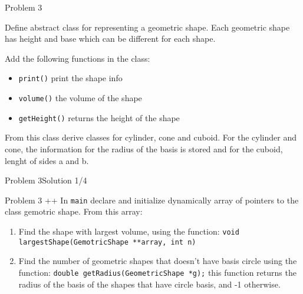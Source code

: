 \begin{frame}{Problem 3}
\begin{scriptsize}
Define abstract class for representing a geometric shape. Each geometric shape
has height and base which can be different for each shape.

Add the following functions in the class:

\begin{itemize}
  \item \texttt{print()} print the shape info
  \item \texttt{volume()} the volume of the shape
  \item \texttt{getHeight()} returns the height of the shape
\end{itemize}

From this class derive classes for cylinder, cone and cuboid. For the cylinder
and cone, the information for the radius of the basis is stored and for the
cuboid, lenght of sides a and b.
\end{scriptsize}
 
\end{frame}

\begin{frame}[fragile]{Problem 3}{Solution 1/4}

\end{frame}

\begin{frame}{Problem 3 ++}
In \texttt{main} declare and initialize dynamically array of pointers to the
class gemotric shape. From this array:

\begin{enumerate}
  \item Find the shape with largest volume, using the function: \texttt{void
  largestShape(GemotricShape **array, int n)}
  \item Find the number of geometric shapes that doesn't have basis circle using
  the function: \texttt{double getRadius(GeometricShape *g);} this function
  returns the radius of the basis of the shapes that have circle basis, and -1
  otherwise.
\end{enumerate}

\end{frame}

